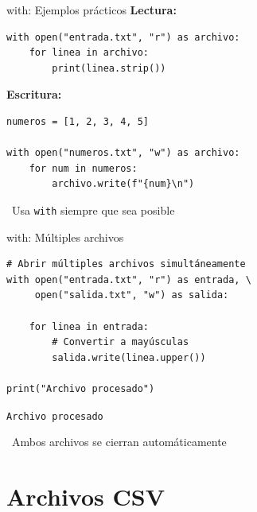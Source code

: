 \documentclass{beamer}
\begin{document}
\begin{frame}[fragile]{with: Ejemplos prácticos \faCode}
\textbf{Lectura:}
\begin{lstlisting}
with open("entrada.txt", "r") as archivo:
    for linea in archivo:
        print(linea.strip())
\end{lstlisting}

\vspace{0.2cm}
\textbf{Escritura:}
\begin{lstlisting}
numeros = [1, 2, 3, 4, 5]

with open("numeros.txt", "w") as archivo:
    for num in numeros:
        archivo.write(f"{num}\n")
\end{lstlisting}

\vspace{-0.1cm}
\begin{notebox}
\small\faLightbulb\ Usa \texttt{with} siempre que sea posible
\end{notebox}
\end{frame}

\begin{frame}[fragile]{with: Múltiples archivos \faFolderOpen}
\begin{lstlisting}
# Abrir múltiples archivos simultáneamente
with open("entrada.txt", "r") as entrada, \
     open("salida.txt", "w") as salida:
    
    for linea in entrada:
        # Convertir a mayúsculas
        salida.write(linea.upper())

print("Archivo procesado")
\end{lstlisting}

\vspace{-0.2cm}
\begin{tcolorbox}[colback=green!10,colframe=green,title={\small\faArrowCircleRight \ Salida},coltitle=fg0,left=3pt,right=3pt,top=2pt,bottom=2pt,boxsep=1pt]
\small\texttt{Archivo procesado}
\end{tcolorbox}

\vspace{-0.1cm}
\begin{notebox}
\small\faInfoCircle\ Ambos archivos se cierran automáticamente
\end{notebox}
\end{frame}

\section{Archivos CSV}
\end{document}
